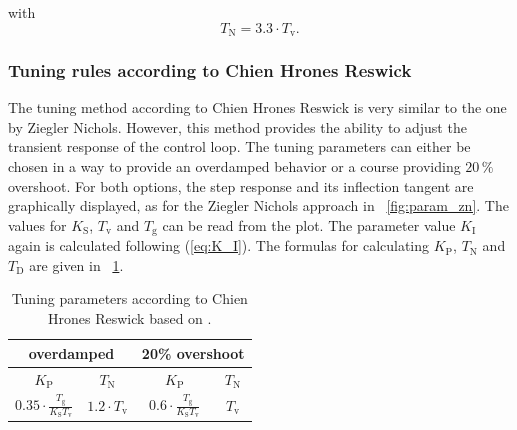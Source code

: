 with
\begin{equation}
    T_{\mathrm{N}}  = 3.3\cdot T_{\mathrm{v}}.
 \label{eq:T_N_zn}
\end{equation}

\subsubsection{Tuning rules according to Chien Hrones Reswick}\label{chap:CHR}
The tuning method according to Chien Hrones Reswick is very similar to the one by Ziegler Nichols. However, this method provides the ability to adjust the transient response of the control loop. The tuning parameters can either be chosen in a way to provide an overdamped behavior or a course providing $20\, \%$ overshoot. \cite{Reg_11}
For both options, the step response and its inflection tangent are graphically displayed, as for the Ziegler Nichols approach in \figurename~\ref{fig:param_zn}.
The values for $K_{\mathrm{S}}$, $T_{\mathrm{v}}$ and $T_{\mathrm{g}}$ can be read from the plot. The parameter value $K_{\mathrm{I}}$ again is calculated following (\ref{eq:K_I}). The formulas for calculating  $K_{\mathrm{P}}$,  $T_{\mathrm{N}}$ and $T_{\mathrm{D}}$ are given in \tablename~\ref{tab:param_chr}.

\begin{table}[ht]
  \centering
  \begin{tabular}{cc|cc}
    \toprule
     \multicolumn{2}{c|}{overdamped} & \multicolumn{2}{c}{20\% overshoot} \\
    \midrule
    $K_{\mathrm{P}}$ &  $T_{\mathrm{N}}$ & $K_{\mathrm{P}}$ &  $T_{\mathrm{N}}$ \\
    \midrule
     $0.35 \cdot \frac{T_{\mathrm{g}}}{K_{\mathrm{S}}T_{\mathrm{v}}}$ & $1.2 \cdot T_{\mathrm{v}}$  & $0.6 \cdot \frac{T_{\mathrm{g}}}{K_{\mathrm{S}}T_{\mathrm{v}}}$ & $T_{\mathrm{v}}$ \\
    \bottomrule
\end{tabular}
  \caption[Tuning parameters according to Chien Hrones Reswick]{Tuning parameters according to Chien Hrones Reswick based on \cite{Reg_17}.}
  \label{tab:param_chr}
\end{table}

